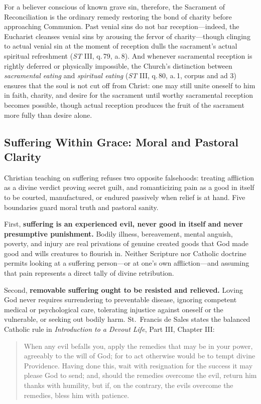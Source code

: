 For a believer conscious of known grave sin, therefore, the Sacrament of Reconciliation is the ordinary remedy restoring the bond of charity before approaching Communion. Past venial sins do not bar reception---indeed, the Eucharist cleanses venial sins by arousing the fervor of charity---though clinging to actual venial sin at the moment of reception dulls the sacrament's actual spiritual refreshment (\emph{ST} III, q.\,79, a.\,8). And whenever sacramental reception is rightly deferred or physically impossible, the Church's distinction between \emph{sacramental eating} and \emph{spiritual eating} (\emph{ST} III, q.\,80, a.\,1, corpus and ad 3) ensures that the soul is not cut off from Christ: one may still unite oneself to him in faith, charity, and desire for the sacrament until worthy sacramental reception becomes possible, though actual reception produces the fruit of the sacrament more fully than desire alone.

\subsection*{Suffering Within Grace: Moral and Pastoral Clarity}

Christian teaching on suffering refuses two opposite falsehoods: treating affliction as a divine verdict proving secret guilt, and romanticizing pain as a good in itself to be courted, manufactured, or endured passively when relief is at hand. Five boundaries guard moral truth and pastoral sanity.

First, \textbf{suffering is an experienced evil, never good in itself and never presumptive punishment.} Bodily illness, bereavement, mental anguish, poverty, and injury are real privations of genuine created goods that God made good and wills creatures to flourish in. Neither Scripture nor Catholic doctrine permits looking at a suffering person---or at one's own affliction---and assuming that pain represents a direct tally of divine retribution.

Second, \textbf{removable suffering ought to be resisted and relieved.} Loving God never requires surrendering to preventable disease, ignoring competent medical or psychological care, tolerating injustice against oneself or the vulnerable, or seeking out bodily harm. St.\ Francis de Sales states the balanced Catholic rule in \emph{Introduction to a Devout Life}, Part III, Chapter III:

\begin{quote}
When any evil befalls you, apply the remedies that may be in your power, agreeably to the will of God; for to act otherwise would be to tempt divine Providence. Having done this, wait with resignation for the success it may please God to send; and, should the remedies overcome the evil, return him thanks with humility, but if, on the contrary, the evils overcome the remedies, bless him with patience.
\end{quote}


